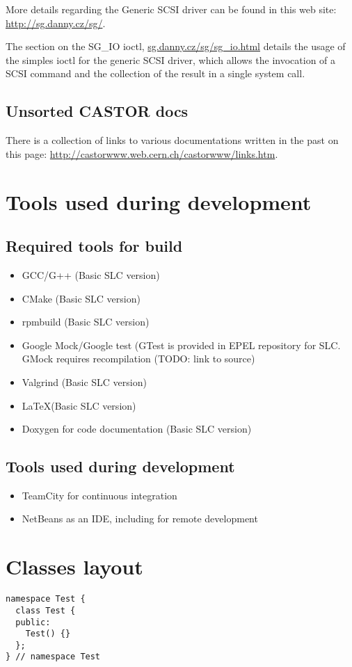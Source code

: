 More details regarding the Generic SCSI driver can be found in this web site: 
\href{http://sg.danny.cz/sg/}{http://sg.danny.cz/sg/}.

The section on the SG\_IO ioctl, \href{sg.danny.cz/sg/sg\_io.html}{sg.danny.cz/sg/sg\_io.html} details the usage of the 
simples ioctl for the generic SCSI driver, which allows the invocation of a SCSI command and the collection of the 
result in a single system call.

\subsection{Unsorted CASTOR docs}
There is a collection of links to various documentations written in the past on this page:
\href{http://castorwww.web.cern.ch/castorwww/links.htm}{http://castorwww.web.cern.ch/castorwww/links.htm}.

\section{Tools used during development}
\subsection{ Required tools for build}
\begin{itemize}
\item{}GCC/G++ (Basic SLC version)
\item{}CMake (Basic SLC version)
\item{}rpmbuild (Basic SLC version)
\item{}Google Mock/Google test (GTest is provided in EPEL repository for SLC. 
  GMock requires recompilation (TODO: link to source)
\item{}Valgrind (Basic SLC version)
\item{}\LaTeX (Basic SLC version)
\item{}Doxygen for code documentation (Basic SLC version)
\end{itemize}

\subsection{Tools used during development}
\begin{itemize}
\item{}TeamCity for continuous integration
\item{}NetBeans as an IDE, including for remote development\
\end{itemize}

\section{Classes layout}

\begin{lstlisting}[caption=Code example,label=code1]
namespace Test {
  class Test {
  public:
    Test() {}
  };
} // namespace Test
\end{lstlisting}


